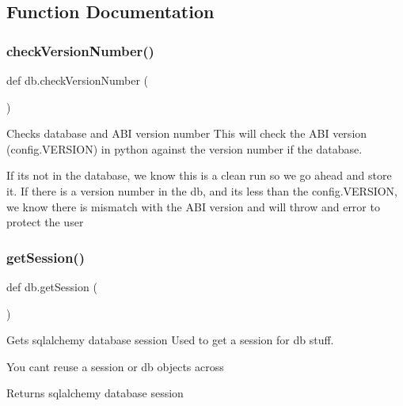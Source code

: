 \subsection{Function Documentation}
\mbox{\label{namespacedb_a2c7a16a011e2939fe901022bcc78574d}} 
\subsubsection{\texorpdfstring{check\+Version\+Number()}{checkVersionNumber()}}
{\footnotesize\ttfamily def db.\+check\+Version\+Number (\begin{DoxyParamCaption}{ }\end{DoxyParamCaption})}



Checks database and A\+BI version number This will check the A\+BI version (config.\+V\+E\+R\+S\+I\+ON) in python against the version number if the database. 

If it\textquotesingle{}s not in the database, we know this is a clean run so we go ahead and store it. If there is a version number in the db, and it\textquotesingle{}s less than the config.\+V\+E\+R\+S\+I\+ON, we know there is mismatch with the A\+BI version and will throw and error to protect the user \mbox{\label{namespacedb_a530aed4ecf4b7ab965ac1d3a432f1e68}} 
\subsubsection{\texorpdfstring{get\+Session()}{getSession()}}
{\footnotesize\ttfamily def db.\+get\+Session (\begin{DoxyParamCaption}{ }\end{DoxyParamCaption})}



Gets sqlalchemy database session Used to get a session for db stuff. 

You can\textquotesingle{}t reuse a session or db objects across \begin{DoxyReturn}{Returns}
sqlalchemy database session 
\end{DoxyReturn}
